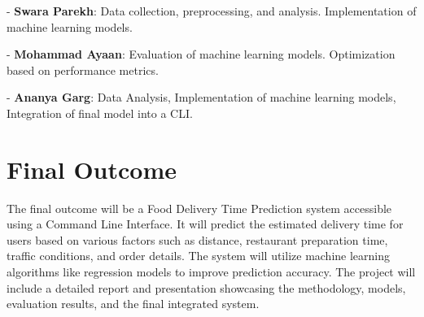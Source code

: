 \documentclass[10pt,twocolumn,letterpaper]{article}
\begin{document}
- \textbf{Swara Parekh}: Data collection, preprocessing, and analysis. Implementation of machine learning models.

- \textbf{Mohammad Ayaan}: Evaluation of machine learning models. Optimization based on performance metrics.

- \textbf{Ananya Garg}: Data Analysis, Implementation of machine learning models, Integration of final model into a CLI.

\section{Final Outcome}
The final outcome will be a Food Delivery Time Prediction system accessible using a Command Line Interface. It will predict the estimated delivery time for users based on various factors such as distance, restaurant preparation time, traffic conditions, and order details. The system will utilize machine learning algorithms like regression models to improve prediction accuracy. The project will include a detailed report and presentation showcasing the methodology, models, evaluation results, and the final integrated system.
\end{document}

